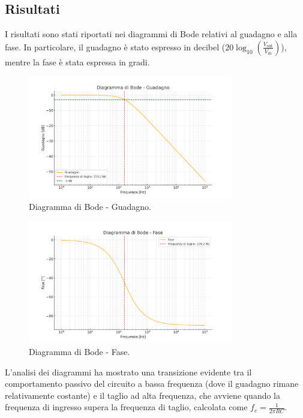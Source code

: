 \documentclass[a4paper,12pt]{article}
\begin{document}
\subsection{Risultati}
I risultati sono stati riportati nei diagrammi di Bode relativi al guadagno e alla fase. In particolare, il guadagno è stato espresso in decibel (\(20 \log_{10} \left( \frac{V_{\text{out}}}{V_{\text{in}}} \right)\)), mentre la fase è stata espressa in gradi.

\begin{figure}[H]
\centering
\includegraphics[width=0.8\textwidth]{assets/bode_gain.png}
\caption{Diagramma di Bode - Guadagno.}
\end{figure}

\begin{figure}[H]
\centering
\includegraphics[width=0.8\textwidth]{assets/bode_phase.png}
\caption{Diagramma di Bode - Fase.}
\end{figure}

L'analisi dei diagrammi ha mostrato una transizione evidente tra il comportamento passivo del circuito a bassa frequenza (dove il guadagno rimane relativamente costante) e il taglio ad alta frequenza, che avviene quando la frequenza di ingresso supera la frequenza di taglio, calcolata come \( f_c = \frac{1}{2 \pi RC} \).
\end{document}
